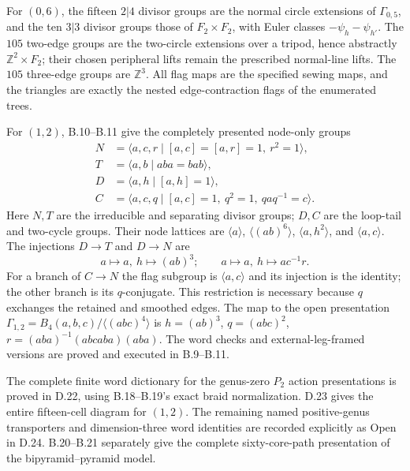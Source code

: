 For $(0,6)$, the fifteen $2|4$ divisor groups are the normal circle extensions of $\Gamma_{0,5}$, and the ten $3|3$ divisor groups those of $F_2\times F_2$, with Euler classes $-\psi_h-\psi_{h'}$. The $105$ two-edge groups are the two-circle extensions over a tripod, hence abstractly $\mathbb Z^2\times F_2$; their chosen peripheral lifts remain the prescribed normal-line lifts. The $105$ three-edge groups are $\mathbb Z^3$. All flag maps are the specified sewing maps, and the triangles are exactly the nested edge-contraction flags of the enumerated trees.

For $(1,2)$, B.10--B.11 give the completely presented node-only groups
\[
\begin{aligned}
 N&=\langle a,c,r\mid [a,c]=[a,r]=1,\ r^2=1\rangle,\\
 T&=\langle a,b\mid aba=bab\rangle,\\
 D&=\langle a,h\mid[a,h]=1\rangle,\\
 C&=\langle a,c,q\mid[a,c]=1,\ q^2=1,\ qaq^{-1}=c\rangle.
\end{aligned}
\]
Here $N,T$ are the irreducible and separating divisor groups; $D,C$ are the loop-tail and two-cycle groups. Their node lattices are $\langle a\rangle$, $\langle(ab)^6\rangle$, $\langle a,h^2\rangle$, and $\langle a,c\rangle$. The injections $D\to T$ and $D\to N$ are
\[
 a\mapsto a,\ h\mapsto(ab)^3;\qquad
 a\mapsto a,\ h\mapsto ac^{-1}r.
\]
For a branch of $C\to N$ the flag subgroup is $\langle a,c\rangle$ and its injection is the identity; the other branch is its $q$-conjugate. This restriction is necessary because $q$ exchanges the retained and smoothed edges. The map to the open presentation
$\Gamma_{1,2}=B_4(a,b,c)/\langle(abc)^4\rangle$
is
$h=(ab)^3$, $q=(abc)^2$, $r=(aba)^{-1}(abcaba)(aba)$.
The word checks and external-leg-framed versions are proved and executed in B.9--B.11.

The complete finite word dictionary for the genus-zero $P_2$ action presentations is proved in D.22, using B.18--B.19's exact braid normalization.  D.23 gives the entire fifteen-cell diagram for $(1,2)$.  The remaining named positive-genus transporters and dimension-three word identities are recorded explicitly as Open in D.24.  B.20--B.21 separately give the complete sixty-core-path presentation of the bipyramid--pyramid model.
